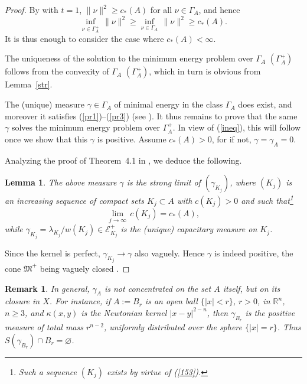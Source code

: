 \documentclass[12pt,a4paper,reqno]{amsart} %
\theoremstyle{lause}
\theoremstyle{maaritelma}
\theoremstyle{lause}
\newtheorem{lemma}[theorem]{Lemma}
\theoremstyle{maaritelma}
\newtheorem{remark}[theorem]{Remark}
\numberwithin{equation}{section}
\begin{document}
\begin{proof}By \cite[Lemma~3.2.2]{F1} with $t=1$, $\|\nu\|^2\geqslant c_*(A)$ for all $\nu\in\Gamma_A$, and hence
\begin{equation}\label{ineq}\inf_{\nu\in\Gamma_A^+}\,\|\nu\|^2\geqslant\inf_{\nu\in\Gamma_A}\,\|\nu\|^2\geqslant c_*(A).\end{equation}
It is thus enough to consider the case where $c_*(A)<\infty$.

The uniqueness of the solution to the minimum energy problem over $\Gamma_A$ $(\Gamma_A^+)$ follows from the convexity of $\Gamma_A$ $(\Gamma_A^+)$, which in turn is obvious from Lemma~\ref{str}.

The (unique) measure $\gamma\in\Gamma_A$ of minimal energy in the class $\Gamma_A$ does exist, and moreover it satisfies (\ref{pr1})--(\ref{pr3}) (see \cite[Theorem~4.1]{F1}). It thus remains to prove that the same $\gamma$ solves the minimum energy problem over $\Gamma_A^+$. In view of (\ref{ineq}), this will follow once we show that this $\gamma$ is positive.
Assume $c_*(A)>0$, for if not, $\gamma=\gamma_A=0$.

Analyzing the proof of Theorem~4.1 in \cite{F1}, we deduce the following.

\begin{lemma}\label{O}The above measure\/ $\gamma$ is the strong limit of\/ $(\gamma_{K_j})$, where\/ $(K_j)$ is an increasing sequence of compact sets\/ $K_j\subset A$ with\/ $c(K_j)>0$ and such that\/\footnote{Such a sequence $(K_j)$ exists by virtue of (\ref{153}).}
\begin{equation}\label{limm}\lim_{j\to\infty}\,c(K_j)=c_*(A),\end{equation}
while\/ $\gamma_{K_j}=\lambda_{K_j}/w(K_j)\in\mathcal E^+_{K_j}$ is the\/ {\rm(}unique\/{\rm)} capacitary measure on\/ $K_j$.
\end{lemma}

Since the kernel is perfect, $\gamma_{K_j}\to\gamma$ also vaguely. Hence $\gamma$ is indeed positive, the cone $\mathfrak M^+$ being vaguely closed \cite[Section~III.1.9, Proposition~14]{B2}.
\end{proof}

\begin{remark}\label{rem4}In general, $\gamma_A$ is {\it not\/} concentrated on the set $A$ itself, but on its closure in $X$.
For instance, if $A:=B_r$ is an open ball $\{|x|<r\}$, $r>0$, in $\mathbb R^n$, $n\geqslant3$, and $\kappa(x,y)$ is the Newtonian kernel $|x-y|^{2-n}$, then $\gamma_{B_r}$ is the positive measure of total mass $r^{n-2}$, uniformly distributed over the sphere $\{|x|=r\}$. Thus $S(\gamma_{B_r})\cap B_r=\varnothing$.
\end{remark}
\end{document}
